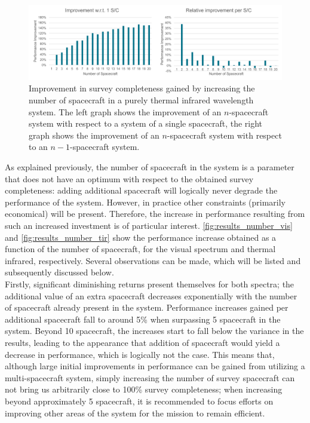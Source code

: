 \begin{figure}[htbp]
 \centering
 \includegraphics[width=1.0\textwidth]{img/number_sc_tir.pdf}
 \caption{Improvement in survey completeness gained by increasing the number of spacecraft in a purely thermal infrared wavelength system. The left graph shows the improvement of an $n$-spacecraft system with respect to a system of a single spacecraft, the right graph shows the improvement of an $n$-spacecraft system with respect to an $n-1$-spacecraft system.}
 \label{fig:results_number_tir}
\end{figure}

As explained previously, the number of spacecraft in the system is a parameter that does not have an optimum with respect to the obtained survey completeness: adding additional spacecraft will logically never degrade the performance of the system. However, in practice other constraints (primarily economical) will be present. Therefore, the increase in performance resulting from such an increased investment is of particular interest. \autoref{fig:results_number_vis} and \autoref{fig:results_number_tir} show the performance increase obtained as a function of the number of spacecraft, for the visual spectrum and thermal infrared, respectively. Several observations can be made, which will be listed and subsequently discussed below.\\

Firstly, significant diminishing returns present themselves for both spectra; the additional value of an extra spacecraft decreases exponentially with the number of spacecraft already present in the system. Performance increases gained per additional spacecraft fall to around 5\% when surpassing 5 spacecraft in the system. Beyond 10 spacecraft, the increases start to fall below the variance in the results, leading to the appearance that addition of spacecraft would yield a decrease in performance, which is logically not the case. This means that, although large initial improvements in performance can be gained from utilizing a multi-spacecraft system, simply increasing the number of survey spacecraft can not bring us arbitrarily close to 100\% survey completeness; when increasing beyond approximately 5 spacecraft, it is recommended to focus efforts on improving other areas of the system for the mission to remain efficient. \\


